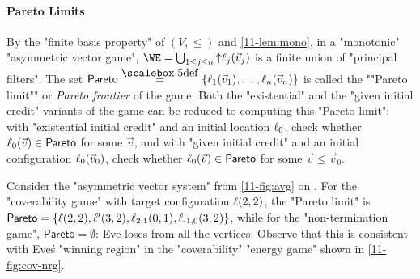 \paragraph{Pareto Limits}\AP By the "finite basis property" of
$(V,{\leq})$ and \cref{11-lem:mono}, in a "monotonic" "asymmetric
vector game", $\WE=\bigcup_{1\leq j\leq n}{\uparrow}\loc_j(\vec v_j)$
is a finite union of "principal filters".  The set
$\mathsf{Pareto}\eqdef\{\loc_1(\vec v_1),\dots,\loc_n(\vec v_n)\}$ is
called the ""Pareto limit"" or \emph{Pareto frontier} of the game.
Both the "existential" and the "given initial credit" variants of the
game can be reduced to computing this "Pareto limit": with
"existential initial credit" and an initial location $\ell_0$, check
whether $\ell_0(\vec v)\in\mathsf{Pareto}$ for some $\vec v$, and with
"given initial credit" and an initial configuration $\ell_0(\vec v_0)$, check
whether $\ell_0(\vec v)\in\mathsf{Pareto}$ for some $\vec v\leq\vec
v_0$.
\begin{example}
  Consider the "asymmetric vector system" from \cref{11-fig:avg} on
  .  For the "coverability game" with target
  configuration $\ell(2,2)$, the "Pareto limit" is
  $\mathsf{Pareto}=\{\ell(2,2),\ell'(3,2),\ell_{2,1}(0,1),\ell_{\text-1,0}(3,2)\}$,
  while for the "non-termination game", $\mathsf{Pareto}=\emptyset$:
  Eve loses from all the vertices.  Observe that this is consistent
  with Eve\'s "winning region" in the "coverability" "energy game"
  shown in \cref{11-fig:cov-nrg}.
\end{example}


